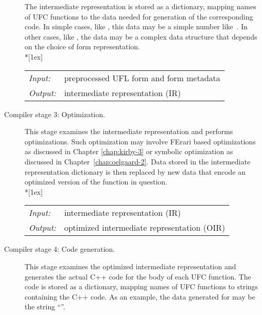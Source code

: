 \begin{description}
  The intermediate representation is stored as a dictionary, mapping
  names of UFC functions to the data needed for generation of the
  corresponding code. In simple cases, like ,
  this data may be a simple number like~. In other cases,
  like \-, the data may be a complex data structure that depends on the choice of form
  representation. \\*[1ex]
  \begin{tabular}{ll}
    \emph{Input:}  & preprocessed UFL form and form metadata \\
    \emph{Output:} & intermediate representation (IR)
  \end{tabular}
\item[Compiler stage 3: Optimization.]
  This stage examines the intermediate representation and performs
  optimizations. Such optimization may involve FErari based
  optimizations as discussed in \nobreak Chapter \ref{chap:kirby-3} or symbolic optimization as discussed in Chapter~\ref{chap:oelgaard-2}.
  Data stored in the
  intermediate representation dictionary is then replaced by new data
  that encode an optimized version of the function in question. \\*[1ex]
  \begin{tabular}{ll}
    \emph{Input:}  & intermediate representation (IR) \\
    \emph{Output:} & optimized intermediate representation (OIR)
  \end{tabular}
\item[Compiler stage 4: Code generation.]
  This stage examines the optimized intermediate representation and
  generates the actual C++ code for the body of each UFC function. The
  code is stored as a dictionary, mapping names of UFC functions to
  strings containing the C++ code. As an example, the data generated for
   may be the string ``''.


\end{description}
